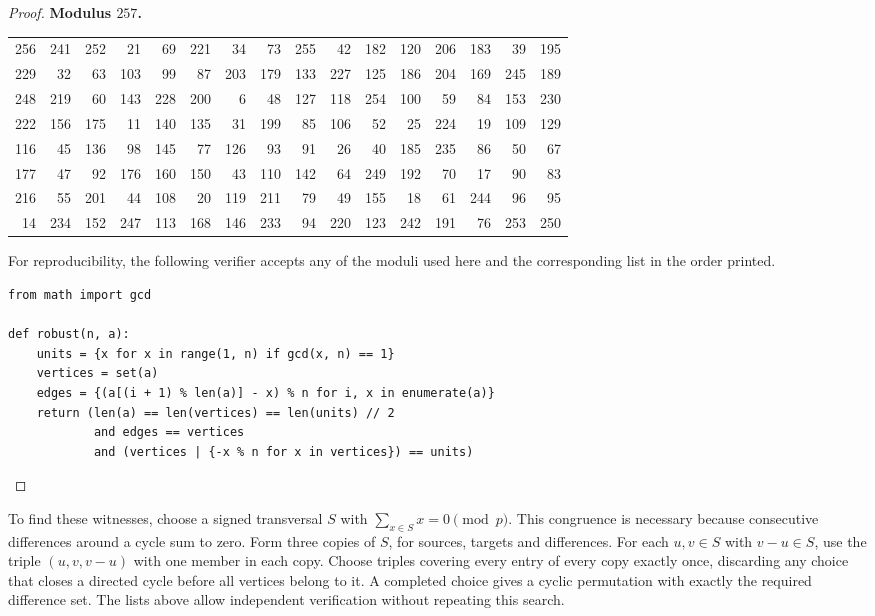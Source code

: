 \documentclass[11pt,a4paper]{article}
\begin{document}
\begin{proof}
\par\noindent\begin{minipage}{\linewidth}
\noindent\textbf{Modulus $257$.}\par\smallskip
{\small\setlength{\tabcolsep}{3pt}\centering
\begin{tabular}{*{16}{r}}
256 & 241 & 252 & 21 & 69 & 221 & 34 & 73 & 255 & 42 & 182 & 120 & 206 & 183 & 39 & 195 \\
229 & 32 & 63 & 103 & 99 & 87 & 203 & 179 & 133 & 227 & 125 & 186 & 204 & 169 & 245 & 189 \\
248 & 219 & 60 & 143 & 228 & 200 & 6 & 48 & 127 & 118 & 254 & 100 & 59 & 84 & 153 & 230 \\
222 & 156 & 175 & 11 & 140 & 135 & 31 & 199 & 85 & 106 & 52 & 25 & 224 & 19 & 109 & 129 \\
116 & 45 & 136 & 98 & 145 & 77 & 126 & 93 & 91 & 26 & 40 & 185 & 235 & 86 & 50 & 67 \\
177 & 47 & 92 & 176 & 160 & 150 & 43 & 110 & 142 & 64 & 249 & 192 & 70 & 17 & 90 & 83 \\
216 & 55 & 201 & 44 & 108 & 20 & 119 & 211 & 79 & 49 & 155 & 18 & 61 & 244 & 96 & 95 \\
14 & 234 & 152 & 247 & 113 & 168 & 146 & 233 & 94 & 220 & 123 & 242 & 191 & 76 & 253 & 250 \\
\end{tabular}\par}
\end{minipage}\par

\smallskip
For reproducibility, the following verifier accepts any of the moduli used here and the corresponding list in the order printed.
\begin{verbatim}
from math import gcd

def robust(n, a):
    units = {x for x in range(1, n) if gcd(x, n) == 1}
    vertices = set(a)
    edges = {(a[(i + 1) % len(a)] - x) % n for i, x in enumerate(a)}
    return (len(a) == len(vertices) == len(units) // 2
            and edges == vertices
            and (vertices | {-x % n for x in vertices}) == units)
\end{verbatim}
\end{proof}

To find these witnesses, choose a signed transversal $S$ with $\sum_{x\in S}x=0\pmod p$. This congruence is necessary because consecutive differences around a cycle sum to zero. Form three copies of $S$, for sources, targets and differences. For each $u,v\in S$ with $v-u\in S$, use the triple $(u,v,v-u)$ with one member in each copy. Choose triples covering every entry of every copy exactly once, discarding any choice that closes a directed cycle before all vertices belong to it. A completed choice gives a cyclic permutation with exactly the required difference set. The lists above allow independent verification without repeating this search.
\end{document}

